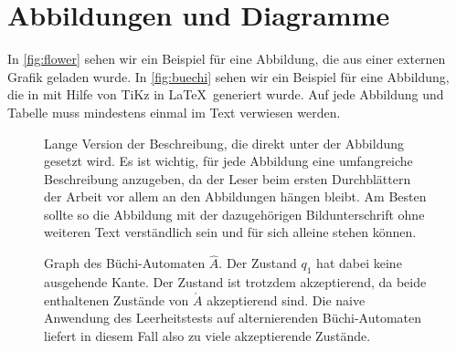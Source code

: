 \section{Abbildungen und Diagramme}

In \vref{fig:flower} sehen wir ein Beispiel für eine Abbildung, die aus einer externen Grafik geladen wurde. In \vref{fig:buechi} sehen wir ein Beispiel für eine Abbildung, die in mit Hilfe von TiKz in \LaTeX\ generiert wurde. Auf jede Abbildung und Tabelle muss mindestens einmal im Text verwiesen werden.


\begin{figure}
  \centering
  \caption[Kurzfassung der Beschreibung für das Abbildungsverzeichnis]{Lange Version der Beschreibung, die direkt unter der Abbildung gesetzt wird. Es ist wichtig, für jede Abbildung eine umfangreiche Beschreibung anzugeben, da der Leser beim ersten Durchblättern der Arbeit vor allem an den Abbildungen hängen bleibt. Am Besten sollte so die Abbildung mit der dazugehörigen Bildunterschrift ohne weiteren Text verständlich sein und für sich alleine stehen können.}
  \label{fig:flower}
\end{figure}

\begin{figure}
  \centering
  \caption[Graph des Büchi-Automaten $\hat A$.]{Graph des Büchi-Automaten $\hat A$. Der Zustand $q_1$ hat dabei keine ausgehende Kante. Der Zustand ist trotzdem akzeptierend, da beide enthaltenen Zustände von $\acute A$ akzeptierend sind. Die naive Anwendung des Leerheitstests auf alternierenden Büchi-Automaten liefert in diesem Fall also zu viele akzeptierende Zustände.}
  \label{fig:buechi}
\end{figure}

